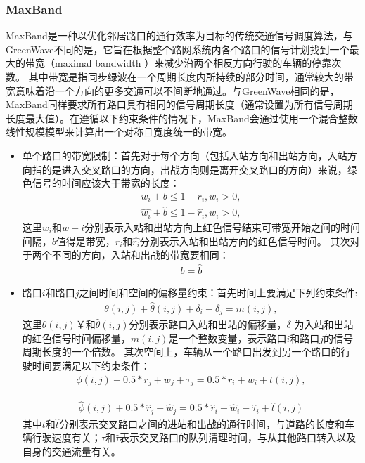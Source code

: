 \subsubsection{MaxBand}
MaxBand是一种以优化邻居路口的通行效率为目标的传统交通信号调度算法，与GreenWave不同的是，它旨在根据整个路网系统内各个路口的信号计划找到一个最大的带宽（maximal bandwidth ）来减少沿两个相反方向行驶的车辆的停靠次数。
其中带宽是指同步绿波在一个周期长度内所持续的部分时间，通常较大的带宽意味着沿一个方向的更多交通可以不间断地通过。与GreenWave相同的是，MaxBand同样要求所有路口具有相同的信号周期长度（通常设置为所有信号周期长度最大值）。在遵循以下约束条件的情况下，MaxBand会通过使用一个混合整数线性规模模型来计算出一个对称且宽度统一的带宽。
\begin{itemize}
    \item 单个路口的带宽限制：首先对于每个方向（包括入站方向和出站方向，入站方向指的是进入交叉路口的方向，出战方向则是离开交叉路口的方向）来说，绿色信号的时间应该大于带宽的长度：
    \begin{align}
        \label{eq:band-cons-1}
        w_i + b \leq 1- r_i, w_i > 0,
    \end{align}
    \begin{align}
        \label{eq:band-cons-2}
        \hat{w_i} + \hat{b} \leq 1- \hat{r_i}, w_i > 0,
    \end{align}
    这里$w_i \text{和} \hat{w-i}$分别表示入站和出站方向上红色信号结束可带宽开始之间的时间间隔，$b$值得是带宽，$r_i \text{和} \hat{r_i}$分别表示入站和出站方向的红色信号时间。
    其次对于两个不同的方向，入站和出战的带宽要相同：
    \begin{align}
        \label{eq:band-cons-3}
        b = \hat{b}
    \end{align}
    \item 路口$i$和路口$j$之间时间和空间的偏移量约束：首先时间上要满足下列约束条件:
    \begin{align}
        \label{eq:temporal-cons}
        \theta(i,j) + \hat{\theta}(i,j) + \delta_i - \delta_j = m(i,j),
    \end{align}
    这里$\theta(i,j)￥\textbf{和}\hat{\theta}(i,j)$分别表示路口入站和出站的偏移量，$\delta$ 为入站和出站的红色信号时间偏移量，$m(i,j)$是一个整数变量，表示路口$i$和路口$j$的信号周期长度的一个倍数。
    其次空间上，车辆从一个路口出发到另一个路口的行驶时间要满足以下约束条件：
    \begin{align}
        \label{eq:spataril-cons-1}
        \phi(i, j)+0.5 * r_{j}+w_{j}+\tau_{j}=0.5 * r_{i}+w_{i}+t(i, j),
    \end{align}

    \begin{align}
        \label{eq:spataril-cons-2}
        \hat{\phi}(i, j)+0.5 * \hat{r}_{j}+\hat{w}_{j}=0.5 * \hat{r}_{i}+\hat{w}_{i}-\hat{\tau}_{i}+\hat{t}(i, j)
    \end{align}
    其中$t$和$\hat{t}$分别表示交叉路口之间的进站和出战的通行时间，与道路的长度和车辆行驶速度有关；$\tau \text{和} \hat{\tau}$表示交叉路口的队列清理时间，与从其他路口转入以及自身的交通流量有关。
\end{itemize}
